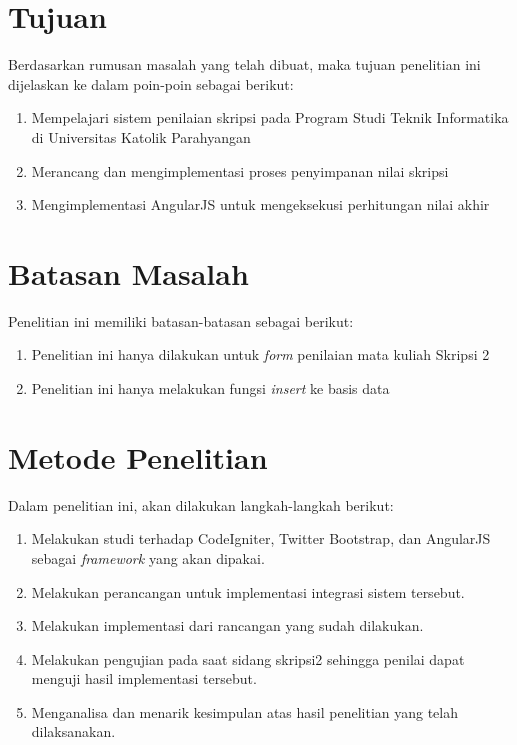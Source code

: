 \section{Tujuan}
\label{sec: tujuan}

	Berdasarkan rumusan masalah yang telah dibuat, maka tujuan penelitian ini dijelaskan ke dalam poin-poin sebagai berikut:
	\begin{enumerate}
		\item Mempelajari sistem penilaian skripsi pada Program Studi Teknik Informatika di Universitas Katolik Parahyangan
		\item Merancang dan mengimplementasi proses penyimpanan nilai skripsi
		\item Mengimplementasi AngularJS untuk mengeksekusi perhitungan nilai akhir
	\end{enumerate}
	
\section{Batasan Masalah}
\label{sec: batasanMasalah}
	
	Penelitian ini memiliki batasan-batasan sebagai berikut:
	
	\begin{enumerate}
		\item Penelitian ini hanya dilakukan untuk \textit{form} penilaian mata kuliah Skripsi 2
		\item Penelitian ini hanya melakukan fungsi \textit{insert} ke basis data
	\end{enumerate}
	
\section{Metode Penelitian}
\label{sec: metodePenelitian}

Dalam penelitian ini, akan dilakukan langkah-langkah berikut:

\begin{enumerate}
	\item Melakukan studi terhadap CodeIgniter, Twitter Bootstrap, dan AngularJS sebagai \textit{framework} yang akan dipakai.
	\item Melakukan perancangan untuk implementasi integrasi sistem tersebut.
	\item Melakukan implementasi dari rancangan yang sudah dilakukan.
	\item Melakukan pengujian pada saat sidang skripsi2 sehingga penilai dapat menguji hasil implementasi tersebut.
	\item Menganalisa dan menarik kesimpulan atas hasil penelitian yang telah dilaksanakan.
\end{enumerate}
	

